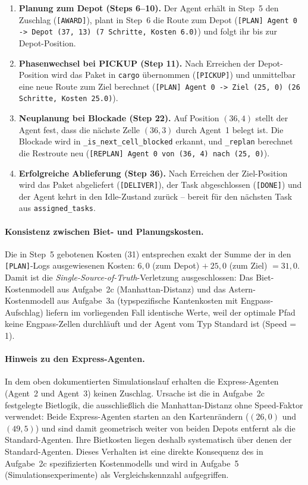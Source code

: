\begin{enumerate}
    \item \textbf{Planung zum Depot (Steps 6--10).} Der Agent erhält in Step~5 den Zuschlag (\texttt{[AWARD]}), plant in Step~6 die Route zum Depot (\texttt{[PLAN] Agent 0 -> Depot (37, 13) (7 Schritte, Kosten 6.0)}) und folgt ihr bis zur Depot-Position.
    \item \textbf{Phasenwechsel bei PICKUP (Step 11).} Nach Erreichen der Depot-Position wird das Paket in \texttt{cargo} übernommen (\texttt{[PICKUP]}) und unmittelbar eine neue Route zum Ziel berechnet (\texttt{[PLAN] Agent 0 -> Ziel (25, 0) (26 Schritte, Kosten 25.0)}).
    \item \textbf{Neuplanung bei Blockade (Step 22).} Auf Position $(36, 4)$ stellt der Agent fest, dass die nächste Zelle $(36, 3)$ durch Agent~1 belegt ist. Die Blockade wird in \texttt{\_is\_next\_cell\_blocked} erkannt, und \texttt{\_replan} berechnet die Restroute neu (\texttt{[REPLAN] Agent 0 von (36, 4) nach (25, 0)}).
    \item \textbf{Erfolgreiche Ablieferung (Step 36).} Nach Erreichen der Ziel-Position wird das Paket abgeliefert (\texttt{[DELIVER]}), der Task abgeschlossen (\texttt{[DONE]}) und der Agent kehrt in den Idle-Zustand zurück -- bereit für den nächsten Task aus \texttt{assigned\_tasks}.
\end{enumerate}

\paragraph{Konsistenz zwischen Biet- und Planungskosten.}
Die in Step~5 gebotenen Kosten (31) entsprechen exakt der Summe der in den \texttt{[PLAN]}-Logs ausgewiesenen Kosten: $6{,}0$ (zum Depot) $+\ 25{,}0$ (zum Ziel) $= 31{,}0$. Damit ist die \textit{Single-Source-of-Truth}-Verletzung ausgeschlossen: Das Biet-Kostenmodell aus Aufgabe~2c (Manhattan-Distanz) und das \acs{Astern}-Kostenmodell aus Aufgabe~3a (typspezifische Kantenkosten mit Engpass-Aufschlag) liefern im vorliegenden Fall identische Werte, weil der optimale Pfad keine Engpass-Zellen durchläuft und der Agent vom Typ Standard ist (Speed = 1).

\paragraph{Hinweis zu den Express-Agenten.}
In dem oben dokumentierten Simulationslauf erhalten die Express-Agenten (Agent~2 und Agent~3) keinen Zuschlag. Ursache ist die in Aufgabe~2c festgelegte Bietlogik, die ausschließlich die Manhattan-Distanz ohne Speed-Faktor verwendet: Beide Express-Agenten starten an den Kartenrändern ($(26,0)$ und $(49,5)$) und sind damit geometrisch weiter von beiden Depots entfernt als die Standard-Agenten. Ihre Bietkosten liegen deshalb systematisch über denen der Standard-Agenten. Dieses Verhalten ist eine direkte Konsequenz des in Aufgabe~2c spezifizierten Kostenmodells und wird in Aufgabe~5 (Simulationsexperimente) als Vergleichskennzahl aufgegriffen.

